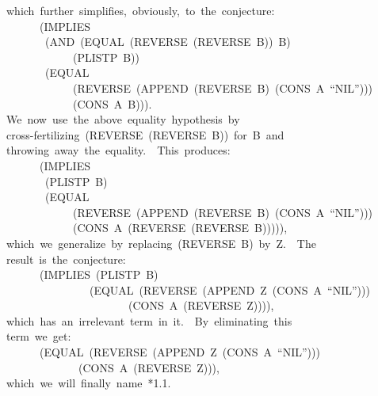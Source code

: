 \documentclass[10pt]{book}
\newenvironment{pubasis}{\begin{flushleft}}{\end{flushleft}}
\begin{document}
\begin{pubasis}
~~which~further~simplifies,~obviously,~to~the~conjecture:\\

~~~~~~~~(IMPLIES\\
~~~~~~~~~(AND~(EQUAL~(REVERSE~(REVERSE~B))~B)\\
~~~~~~~~~~~~~~(PLISTP~B))\\
~~~~~~~~~(EQUAL\\
~~~~~~~~~~~~~~(REVERSE~(APPEND~(REVERSE~B)~(CONS~A~``NIL'')))\\
~~~~~~~~~~~~~~(CONS~A~B))).\\

~~We~now~use~the~above~equality~hypothesis~by\\
~~cross-fertilizing~(REVERSE~(REVERSE~B))~for~B~and\\
~~throwing~away~the~equality.~~This~produces:\\

~~~~~~~~(IMPLIES\\
~~~~~~~~~(PLISTP~B)\\
~~~~~~~~~(EQUAL\\
~~~~~~~~~~~~~~(REVERSE~(APPEND~(REVERSE~B)~(CONS~A~``NIL'')))\\
~~~~~~~~~~~~~~(CONS~A~(REVERSE~(REVERSE~B))))),\\

~~which~we~generalize~by~replacing~(REVERSE~B)~by~Z.~~The\\
~~result~is~the~conjecture:\\

~~~~~~~~(IMPLIES~(PLISTP~B)\\
~~~~~~~~~~~~~~~~~(EQUAL~(REVERSE~(APPEND~Z~(CONS~A~``NIL'')))\\
~~~~~~~~~~~~~~~~~~~~~~~~(CONS~A~(REVERSE~Z)))),\\

~~which~has~an~irrelevant~term~in~it.~~By~eliminating~this\\
~~term~we~get:\\

~~~~~~~~(EQUAL~(REVERSE~(APPEND~Z~(CONS~A~``NIL'')))\\
~~~~~~~~~~~~~~~(CONS~A~(REVERSE~Z))),\\

~~which~we~will~finally~name~*1.1.\\


\end{pubasis}
\end{document}
